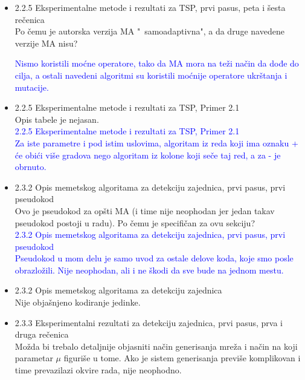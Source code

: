 \documentclass[a4paper]{report}
\newcommand{\odgovor}[1]{\textcolor{blue}{#1}}
\begin{document}
\begin{itemize}
    
    \item 2.2.5 Eksperimentalne metode i rezultati za TSP, prvi pasus, peta i šesta rečenica \\
    Po čemu je autorska verzija MA "\ samoadaptivna", a da druge navedene verzije MA nisu?
    
    \odgovor{
    Nismo koristili moćne operatore, tako da MA mora na teži način da dođe do cilja, a ostali navedeni algoritmi su koristili moćnije operatore ukrštanja i mutacije.}
    
    \item 2.2.5 Eksperimentalne metode i rezultati za TSP, Primer 2.1 \\
    Opis tabele je nejasan.\\
       \odgovor{ 2.2.5 Eksperimentalne metode i rezultati za TSP, Primer 2.1\\
       Za iste parametre i pod istim uslovima,  algoritam iz reda koji ima oznaku + će obići više gradova nego algoritam iz kolone koji seče taj red, a za - je obrnuto.}
    
    
    \item 2.3.2 Opis memetskog algoritama za detekciju zajednica, prvi pasus, prvi pseudokod \\
    Ovo je pseudokod za opšti MA (i time nije neophodan jer jedan takav pseudokod postoji u radu). Po čemu je specifičan za ovu sekciju?\\
     \odgovor{ 2.3.2 Opis memetskog algoritama za detekciju zajednica, prvi pasus, prvi pseudokod \\
     Pseudokod u mom delu je samo uvod za ostale delove koda, koje smo posle obrazložili. Nije neophodan, ali i ne škodi da sve bude na jednom mestu.}
    
    \item 2.3.2 Opis memetskog algoritama za detekciju zajednica \\
    Nije objašnjeno kodiranje jedinke.
    \item 2.3.3 Eksperimentalni rezultati za detekciju zajednica, prvi pasus, prva i druga rečenica \\
    Možda bi trebalo detaljnije objasniti način generisanja mreža i način na koji parametar $\mu$ figuriše u tome. Ako je sistem generisanja previše komplikovan i time prevazilazi okvire rada, nije neophodno.
\end{itemize}
\end{document}
